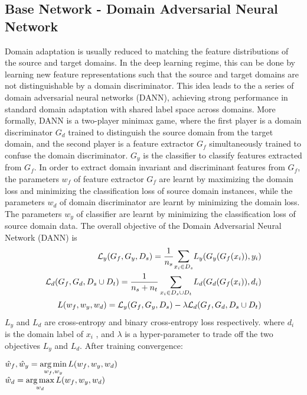\subsection{Base Network - Domain Adversarial Neural Network}
\label{subsec:dann}
Domain adaptation is usually reduced to matching the feature distributions of the source and target domains. In the deep learning regime, this can be done by
learning new feature representations such that the source and target domains
are not distinguishable by a domain discriminator. This idea leads to the a series
of domain adversarial neural networks (DANN)\cite{uda,dann,deeptransfer}, achieving strong performance
in standard domain adaptation with shared label space across domains.
More formally, DANN is a two-player minimax game, where the first player is
a domain discriminator $G_d$ trained to distinguish the source domain from the
target domain, and the second player is a feature extractor $G_f$ simultaneously
trained to confuse the domain discriminator. $G_y$ is the classifier to classify features extracted from $G_f$.
In order to extract domain invariant and discriminant features from $G_f$, the parameters $w_f$ of feature extractor $G_f$ are learnt by maximizing the domain loss and minimizing the classification loss of source domain instances, while the parameters $w_d$ of domain discriminator are learnt by minimizing the domain loss. The parameters $w_y$ of classifier are learnt by minimizing the classification loss of source domain data.
The overall objective of the Domain Adversarial Neural Network (DANN) is
\begin{equation}
\begin{align}
    \mathcal{L}_y(G_f, G_y, D_s)  = \dfrac{1}{n_{s}} \mathlarger\sum\limits_{x_i \in D_s} L_y(G_y(G_f(x_i)),y_i)\\
     \mathcal{L}_d(G_f, G_d, D_s \cup D_t) = \dfrac{1}{n_s + n_t} \sum\limits_{x_i \in {D_s \cup D_t}} L_d(G_d(G_f(x_i)),d_i)\\
     L(w_f, w_y, w_d) = \mathcal{L}_y(G_f, G_y, D_s) - \lambda \mathcal{L}_d(G_f, G_d, D_s \cup D_t)
\end{align}
\end{equation}
$L_y$ and $L_d$ are cross-entropy and binary cross-entropy loss respectively. where $d_i$ is the domain label of $x_i$ , and $\lambda$ is a hyper-parameter to trade off the
two objectives $L_y$ and $L_d$. After training convergence:
\begin{center}
    $\hat{w}_f, \hat{w}_y  = \operatorname*{arg\,min} \limits_{w_f, w_y} L(w_f, w_y, w_d)$\\
    $\hat{w}_d  = \operatorname*{arg\,max} \limits_{w_d} L(w_f, w_y, w_d)$
\end{center}


